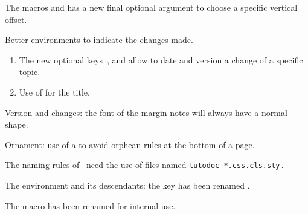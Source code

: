 \begin{tdocnew}[version = 1.6.2, date = 2024-10-30]
	\item The macros  and  has a new final optional argument  to choose a specific vertical offset.

	\item Better environments to indicate the changes made.
	\begin{enumerate}
        \item The new optional keys \,,  and  allow to date and version a change of a specific topic.

        \item Use of  for the title.
	\end{enumerate}
\end{tdocnew}


\begin{tdocupdate}
	\item Version and changes: the font of the margin notes will always have a normal shape.

	\item Ornament: use of a \tdocinlatex{\cleaders} to avoid orphean rules at the bottom of a page.
\end{tdocupdate}

\tdocsep




\begin{tdoctech}[version = 1.6.1, date = 2024-10-28]
    \item The naming rules of \ctan\ need the use of  files named \verb+tutodoc-*.css.cls.sty+\,.
\end{tdoctech}

\tdocsep




\begin{tdocbreak}[version = 1.6.0, date = 2024-10-27]
    \item The  environment and its descendants: the  key has been renamed .

    \item The macro  has been renamed  for internal use.
\end{tdocbreak}


